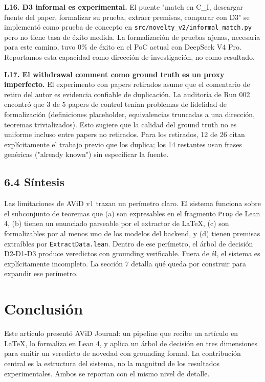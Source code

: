 \documentclass[12pt,a4paper]{article}
\theoremstyle{remark}
\begin{document}
\textbf{L16. D3 informal es experimental.} El puente "match en C\_I, descargar fuente del paper, formalizar su prueba, extraer premisas, comparar con D3" se implementó como prueba de concepto en \texttt{src/novelty\_v2/informal\_match.py} pero no tiene tasa de éxito medida. La formalización de pruebas ajenas, necesaria para este camino, tuvo 0\% de éxito en el PoC actual con DeepSeek V4 Pro. Reportamos esta capacidad como dirección de investigación, no como resultado.


\textbf{L17. El withdrawal comment como ground truth es un proxy imperfecto.} El experimento con papers retirados asume que el comentario de retiro del autor es evidencia confiable de duplicación. La auditoría de Run 002 encontró que 3 de 5 papers de control tenían problemas de fidelidad de formalización (definiciones placeholder, equivalencias truncadas a una dirección, teoremas trivializados). Esto sugiere que la calidad del ground truth no es uniforme incluso entre papers no retirados. Para los retirados, 12 de 26 citan explícitamente el trabajo previo que los duplica; los 14 restantes usan frases genéricas ("already known") sin especificar la fuente.


\subsection{6.4 Síntesis}

Las limitaciones de AViD v1 trazan un perímetro claro. El sistema funciona sobre el subconjunto de teoremas que (a) son expresables en el fragmento \texttt{Prop} de Lean 4, (b) tienen un enunciado parseable por el extractor de LaTeX, (c) son formalizables por al menos uno de los modelos del backend, y (d) tienen premisas extraíbles por \texttt{ExtractData.lean}. Dentro de ese perímetro, el árbol de decisión D2-D1-D3 produce veredictos con grounding verificable. Fuera de él, el sistema es explícitamente incompleto. La sección 7 detalla qué queda por construir para expandir ese perímetro.


\section{Conclusión}

Este artículo presentó AViD Journal: un pipeline que recibe un artículo en LaTeX, lo formaliza en Lean 4, y aplica un árbol de decisión en tres dimensiones para emitir un veredicto de novedad con grounding formal. La contribución central es la estructura del sistema, no la magnitud de los resultados experimentales. Ambos se reportan con el mismo nivel de detalle.
\end{document}
